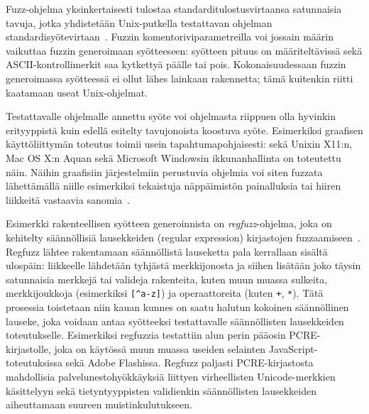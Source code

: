 Fuzz-ohjelma yksinkertaisesti tulostaa standarditulostusvirtaansa satunnaisia tavuja,
jotka yhdistetään Unix-putkella testattavan ohjelman standardisyötevirtaan~\cite{UnixReliability}.
Fuzzin komentoriviparametreilla voi jossain määrin vaikuttaa fuzzin generoimaan syötteeseen:
syötteen pituus on määriteltävissä sekä ASCII-kontrollimerkit saa kytkettyä päälle tai pois.
Kokonaisuudessaan fuzzin generoimassa syötteessä ei ollut lähes lainkaan rakennetta;
tämä kuitenkin riitti kaatamaan useat Unix-ohjelmat.

Testattavalle ohjelmalle annettu syöte voi ohjelmasta riippuen olla
hyvinkin erityyppistä kuin edellä esitelty tavujonoista koostuva syöte.
Esimerkiksi graafisen käyttöliittymän toteutus toimii usein tapahtumapohjaisesti:
sekä Unixin X11:n, Mac OS X:n Aquan sekä Microsoft Windowsin ikkunanhallinta on toteutettu näin.
Näihin graafisiin järjestelmiin perustuvia ohjelmia voi siten fuzzata lähettämällä
niille esimerkiksi tekaistuja näppäimistön painalluksia tai hiiren liikkeitä vastaavia
sanomia~\cite{X11Fuzz,MacOsFuzz,WinNtFuzz}.

Esimerkki rakenteellisen syötteen generoinnista on \emph{regfuzz}-ohjelma,
joka on kehitelty säännöllisiä lausekkeiden (regular expression) kirjastojen
fuzzaamiseen~\cite{RegFuzz}.
Regfuzz lähtee rakentamaan säännöllistä lauseketta pala kerrallaan sisältä ulospäin:
liikkeelle lähdetään tyhjästä merkkijonosta ja siihen lisätään joko täysin
satunnaisia merkkejä tai valideja rakenteita,
kuten muun muassa sulkeita, merkkijoukkoja (esimerkiksi \texttt{[\^{}a-z]}) ja
operaattoreita (kuten \texttt{+}, \texttt{*}).
Tätä prosessia toistetaan niin kauan kunnes on saatu halutun kokoinen säännöllinen lauseke,
joka voidaan antaa syötteeksi testattavalle säännöllisten lausekkeiden toteutukselle.
Esimerkiksi regfuzzia testattiin alun perin pääosin PCRE-kirjastolle,
joka on käytössä muun muassa useiden selainten JavaScript-toteutuksissa sekä Adobe Flashissa.
Regfuzz paljasti PCRE-kirjastosta mahdollisia palvelunestohyökkäyksiä liittyen
virheellisten Unicode-merkkien käsittelyyn sekä tietyntyyppisten validienkin
säännöllisten lausekkeiden aiheuttamaan suureen muistinkulutukseen.

